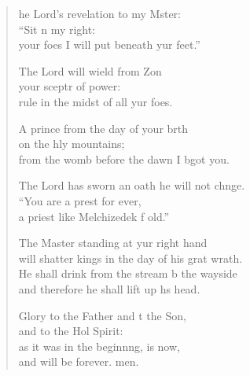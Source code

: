 \settowidth{\versewidth}{will shatter kings in the day of his great wrath.}
\begin{verse}%
  \begin{patverse}
he Lord’s revelation to my Mster:\Flex\\
“Sit n my right:\Med\\
your foes I will put beneath yur feet.”

The Lord will wield from Z\pointup{\i}on\Flex\\
your sceptr of power:\Med\\
rule in the midst of all yur foes.

A prince from the day of your b\pointup{\i}rth\Flex\\
on the hly mountains;\Med\\
from the womb before the dawn I bgot you.

The Lord has sworn an oath he will not chnge.\Flex\\
“You are a pr\pointup{\i}est for ever,\Med\\
a priest like Melchizedek f old.”

The Master standing at yur right hand\Med\\
will shatter kings in the day of his grat wrath.\\
He shall drink from the stream b the wayside\Med\\
and therefore he shall lift up h\pointup{\i}s head.

Glory to the Father and t the Son,\Med\\
and to the Hol Spirit:\\
as it was in the beginn\pointup{\i}ng, is now,\Med\\
and will be forever. men.
  \end{patverse}
\end{verse}
